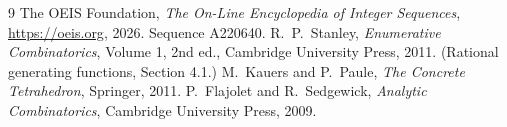 \documentclass[11pt,a4paper]{article}
\theoremstyle{plain}
\theoremstyle{definition}
\begin{document}
\begin{thebibliography}{9}
 The OEIS Foundation, \emph{The On-Line Encyclopedia of Integer
Sequences}, \url{https://oeis.org}, 2026. Sequence A220640.
 R.~P.~Stanley, \emph{Enumerative Combinatorics}, Volume 1, 2nd ed.,
Cambridge University Press, 2011. (Rational generating functions, Section 4.1.)
 M.~Kauers and P.~Paule, \emph{The Concrete Tetrahedron}, Springer, 2011.
 P.~Flajolet and R.~Sedgewick, \emph{Analytic Combinatorics}, Cambridge
University Press, 2009.
\end{thebibliography}
\end{document}

